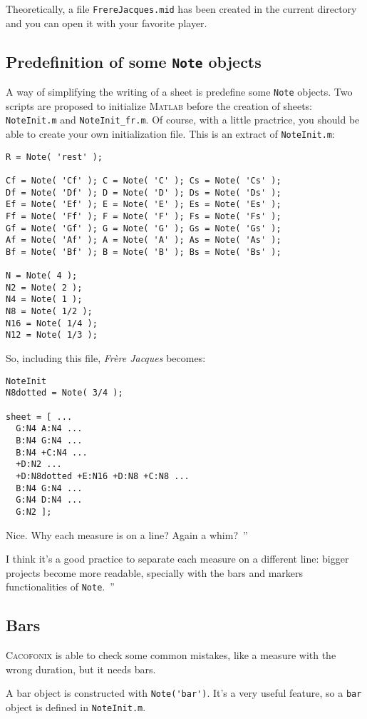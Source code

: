 \documentclass{article}
\newcommand{\cacofonix}{\textsc{Cacofonix}\xspace}
\newcommand{\matlab}{\textsc{Matlab}\xspace}
\newcommand{\note}{\lstinline!Note!\xspace}
\newcommand{\frerejaques}{\emph{Fr\`ere Jacques}\xspace}
\newcommand{\file}[1]{\texttt{#1}\xspace}
\newcommand{\noteInitFile}{\file{NoteInit.m}}
\newcommand{\noteInitFrFile}{\file{NoteInit\_fr.m}}
\newenvironment{meenv}{ \par \noindent \makebox[6em][r]{ \textcolor{mecolor}{Me}: `` --~}}{~''}
\newenvironment{myselfenv}{ \par \noindent \makebox[6em][r]{ \textcolor{myselfcolor}{Myself}: `` --~}}{~''}
\newcommand{\me}[1]{\begin{meenv}#1\end{meenv}}
\newcommand{\myself}[1]{\begin{myselfenv}#1\end{myselfenv}}
\begin{document}
Theoretically, a file \file{FrereJacques.mid} has been created in the current directory and you can open it with your favorite player.

\subsection{Predefinition of some \note objects}

A way of simplifying the writing of a sheet is predefine some \note objects. Two scripts are proposed to initialize \matlab before the creation of sheets: \noteInitFile and \noteInitFrFile. Of course, with a little practrice, you should be able to create your own initialization file. This is an extract of \noteInitFile:
\begin{lstlisting}
R = Note( 'rest' );

Cf = Note( 'Cf' ); C = Note( 'C' ); Cs = Note( 'Cs' );
Df = Note( 'Df' ); D = Note( 'D' ); Ds = Note( 'Ds' );
Ef = Note( 'Ef' ); E = Note( 'E' ); Es = Note( 'Es' );
Ff = Note( 'Ff' ); F = Note( 'F' ); Fs = Note( 'Fs' );
Gf = Note( 'Gf' ); G = Note( 'G' ); Gs = Note( 'Gs' );
Af = Note( 'Af' ); A = Note( 'A' ); As = Note( 'As' );
Bf = Note( 'Bf' ); B = Note( 'B' ); Bs = Note( 'Bs' );

N = Note( 4 );
N2 = Note( 2 );
N4 = Note( 1 );
N8 = Note( 1/2 );
N16 = Note( 1/4 );
N12 = Note( 1/3 );
\end{lstlisting}

So, including this file, \frerejaques becomes:
\begin{lstlisting}
NoteInit
N8dotted = Note( 3/4 );

sheet = [ ...
  G:N4 A:N4 ...
  B:N4 G:N4 ...
  B:N4 +C:N4 ...
  +D:N2 ...
  +D:N8dotted +E:N16 +D:N8 +C:N8 ...
  B:N4 G:N4 ...
  G:N4 D:N4 ...
  G:N2 ];
\end{lstlisting}

\me{Nice. Why each measure is on a line? Again a whim?}
\myself{I think it's a good practice to separate each measure on a different line: bigger projects become more readable, specially with the bars and markers functionalities of \note.}

\subsection{Bars}

\cacofonix is able to check some common mistakes, like a measure with the wrong duration, but it needs bars.

A bar object is constructed with \lstinline!Note('bar')!. It's a very useful feature, so a \lstinline!bar! object is defined in \noteInitFile.
\end{document}
